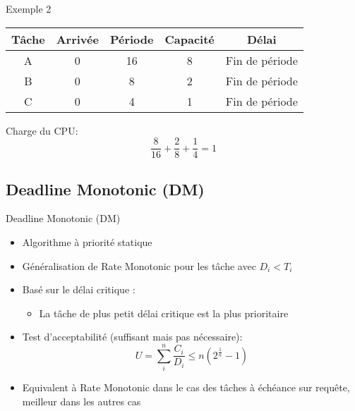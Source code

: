 \begin{frame}{Exemple 2}
    \begin{center}
      \begin{tabular}{ccccc}
        \hline
        Tâche & Arrivée & Période & Capacité & Délai \\
        \hline
        A & 0 & 16 & 8 & Fin de période\\
        B & 0 &  8 & 2 & Fin de période\\
        C & 0 &  4 & 1 & Fin de période\\
        \hline
      \end{tabular}
    \end{center}
    \pause
    Charge du CPU:
    $$\frac{8}{16} + \frac{2}{8} + \frac{1}{4} = 1$$
    \pause
    \begin{center}
      
    \end{center}
\end{frame}

\subsection{Deadline Monotonic (DM)}

\begin{frame}{Deadline Monotonic (DM)} 
  \begin{itemize}
  \item Algorithme à priorité statique
  \item Généralisation de Rate Monotonic pour les tâche avec $D_i < T_i$
  \item Basé sur le délai critique :
    \begin{itemize}
    \item La tâche de plus petit délai critique est la plus prioritaire
    \end{itemize}
  \item Test d'acceptabilité (suffisant mais pas nécessaire):
    $$U = \sum_i^n \frac{C_i}{D_i} ≤ n \left(2^{\frac{1}{n}}-1\right)$$
  \item Equivalent à Rate Monotonic  dans le cas des tâches à échéance
    sur requête, meilleur dans les autres cas
  \end{itemize}
\end{frame}

